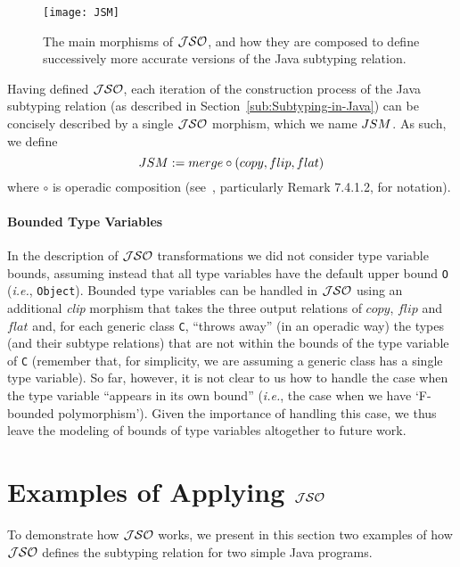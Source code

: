 \documentclass[twocolumn,english]{article}
\numberwithin{equation}{section}
\numberwithin{figure}{section}
\newcommand{\code}[1]{\texttt{#1}}
\begin{document}
\begin{figure}
\noindent \begin{centering}
\texttt{[image: JSM]}
\par\end{centering}

\protect\caption{\label{fig:JSO-Morphisms}The main morphisms of $\protect\mathcal{JSO}$, and
how they are composed to define successively more accurate versions
of the Java subtyping relation.}
\end{figure}


Having defined $\mathcal{JSO}$, each iteration of the construction process
of the Java subtyping relation (as described in Section~\ref{sub:Subtyping-in-Java})
can be concisely described by a single $\mathcal{JSO}$ morphism, which we
name $JSM$. As such, we define
\[
JSM:=merge\circ(copy,flip,flat)
\]
where $\circ$ is operadic composition (see~\cite[Sec. 7.4]{spivak2014category},
particularly Remark 7.4.1.2, for notation). 


\paragraph{Bounded Type Variables}

In the description of $\mathcal{JSO}$ transformations we did not consider
type variable bounds, assuming instead that all type variables have
the default upper bound \code{O} (\emph{i.e.}, \code{Object}). Bounded
type variables can be handled in $\mathcal{JSO}$ using an additional \emph{clip}
morphism that takes the three output relations of $copy$, $flip$
and $flat$ and, for each generic class \code{C}, ``throws away''
(in an operadic way) the types (and their subtype relations) that
are not within the bounds of the type variable of \code{C} (remember
that, for simplicity, we are assuming a generic class has a single
type variable). So far, however, it is not clear to us how to handle
the case when the type variable ``appears in its own bound'' (\emph{i.e.},
the case when we have `F-bounded polymorphism'). Given the importance
of handling this case, we thus leave the modeling of bounds of type
variables altogether to future work.




\section{\label{sec:Applying-JSO}Examples of Applying $\protect\mathcal{JSO}$}

To demonstrate how $\mathcal{JSO}$ works, we present in this section two examples
of how $\mathcal{JSO}$ defines the subtyping relation for two simple Java
programs.
\end{document}
